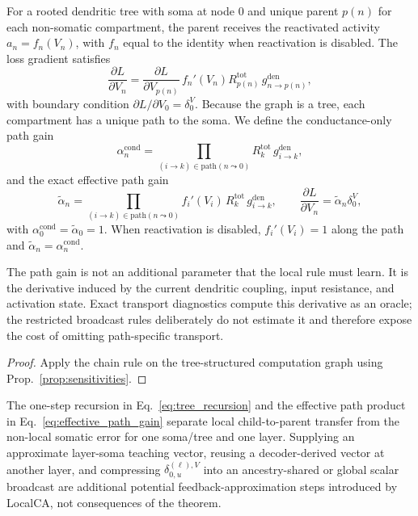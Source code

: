    \begin{theorem}
    \label{thm:tree_backprop}
    For a rooted dendritic tree with soma at node $0$ and unique parent $p(n)$ for each non-somatic compartment, the parent receives the reactivated activity $a_n=f_n(V_n)$, with $f_n$ equal to the identity when reactivation is disabled. The loss gradient satisfies
    \begin{equation}
    \frac{\partial L}{\partial V_n}
    = \frac{\partial L}{\partial V_{p(n)}}\, f_n'(V_n)R_{p(n)}^{\mathrm{tot}}\, g_{n\to p(n)}^{\mathrm{den}},
    \label{eq:tree_recursion}
    \end{equation}
    with boundary condition $\partial L / \partial V_0 = \delta_0^V$. Because the graph is a tree, each compartment has a unique path to the soma. We define the conductance-only path gain
    \begin{equation}
    \alpha_n^{\mathrm{cond}}
    = \prod_{(i\to k)\in \mathrm{path}(n\leadsto 0)} R_k^{\mathrm{tot}}\, g_{i\to k}^{\mathrm{den}},
    \label{eq:path_sum}
    \end{equation}
    and the exact effective path gain
    \begin{equation}
    \tilde{\alpha}_n
    = \prod_{(i\to k)\in \mathrm{path}(n\leadsto 0)}
    f_i'(V_i)\,R_k^{\mathrm{tot}}\,g_{i\to k}^{\mathrm{den}},
    \qquad
    \frac{\partial L}{\partial V_n} = \tilde{\alpha}_n\delta_0^V,
    \label{eq:effective_path_gain}
    \end{equation}
    with $\alpha_0^{\mathrm{cond}}=\tilde{\alpha}_0=1$. When reactivation is disabled, $f_i'(V_i)=1$ along the path and $\tilde{\alpha}_n=\alpha_n^{\mathrm{cond}}$.
    \end{theorem}
    The path gain is not an additional parameter that the local rule must learn. It is the derivative induced by the current dendritic coupling, input resistance, and activation state. Exact transport diagnostics compute this derivative as an oracle; the restricted broadcast rules deliberately do not estimate it and therefore expose the cost of omitting path-specific transport.
    \begin{proof}
    Apply the chain rule on the tree-structured computation graph using Prop.~\ref{prop:sensitivities}.
    \end{proof}
    The one-step recursion in Eq.~\eqref{eq:tree_recursion} and the effective path product in Eq.~\eqref{eq:effective_path_gain} separate local child-to-parent transfer from the non-local somatic error for one soma/tree and one layer. Supplying an approximate layer-soma teaching vector, reusing a decoder-derived vector at another layer, and compressing $\delta_{0,u}^{(\ell),V}$ into an ancestry-shared or global scalar broadcast are additional potential feedback-approximation steps introduced by LocalCA, not consequences of the theorem.

